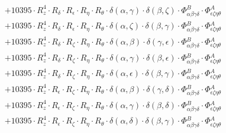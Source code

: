 \documentclass{article}
\begin{document}
\begin{equation}
\begin{array}{c}
 \\[0.2em] 		 + 10395 \cdot R_{z}^{4} \cdot R_{\delta{}} \cdot R_{\epsilon{}} \cdot R_{\eta{}} \cdot R_{\theta{}} \cdot \delta{}\left(\alpha{}, \gamma{}\right) \cdot \delta{}\left(\beta{}, \zeta{}\right) \cdot \Phi{}^{B}_{\alpha{}\beta{}\gamma{}\delta{}} \cdot \Phi{}^{A}_{\epsilon{}\zeta{}\eta{}\theta{}} 
 \\[0.2em] 		 + 10395 \cdot R_{z}^{4} \cdot R_{\delta{}} \cdot R_{\epsilon{}} \cdot R_{\eta{}} \cdot R_{\theta{}} \cdot \delta{}\left(\alpha{}, \zeta{}\right) \cdot \delta{}\left(\beta{}, \gamma{}\right) \cdot \Phi{}^{B}_{\alpha{}\beta{}\gamma{}\delta{}} \cdot \Phi{}^{A}_{\epsilon{}\zeta{}\eta{}\theta{}} 
 \\[0.2em] 		 + 10395 \cdot R_{z}^{4} \cdot R_{\delta{}} \cdot R_{\zeta{}} \cdot R_{\eta{}} \cdot R_{\theta{}} \cdot \delta{}\left(\alpha{}, \beta{}\right) \cdot \delta{}\left(\gamma{}, \epsilon{}\right) \cdot \Phi{}^{B}_{\alpha{}\beta{}\gamma{}\delta{}} \cdot \Phi{}^{A}_{\epsilon{}\zeta{}\eta{}\theta{}} 
 \\[0.2em] 		 + 10395 \cdot R_{z}^{4} \cdot R_{\delta{}} \cdot R_{\zeta{}} \cdot R_{\eta{}} \cdot R_{\theta{}} \cdot \delta{}\left(\alpha{}, \gamma{}\right) \cdot \delta{}\left(\beta{}, \epsilon{}\right) \cdot \Phi{}^{B}_{\alpha{}\beta{}\gamma{}\delta{}} \cdot \Phi{}^{A}_{\epsilon{}\zeta{}\eta{}\theta{}} 
 \\[0.2em] 		 + 10395 \cdot R_{z}^{4} \cdot R_{\delta{}} \cdot R_{\zeta{}} \cdot R_{\eta{}} \cdot R_{\theta{}} \cdot \delta{}\left(\alpha{}, \epsilon{}\right) \cdot \delta{}\left(\beta{}, \gamma{}\right) \cdot \Phi{}^{B}_{\alpha{}\beta{}\gamma{}\delta{}} \cdot \Phi{}^{A}_{\epsilon{}\zeta{}\eta{}\theta{}} 
 \\[0.2em] 		 + 10395 \cdot R_{z}^{4} \cdot R_{\epsilon{}} \cdot R_{\zeta{}} \cdot R_{\eta{}} \cdot R_{\theta{}} \cdot \delta{}\left(\alpha{}, \beta{}\right) \cdot \delta{}\left(\gamma{}, \delta{}\right) \cdot \Phi{}^{B}_{\alpha{}\beta{}\gamma{}\delta{}} \cdot \Phi{}^{A}_{\epsilon{}\zeta{}\eta{}\theta{}} 
 \\[0.2em] 		 + 10395 \cdot R_{z}^{4} \cdot R_{\epsilon{}} \cdot R_{\zeta{}} \cdot R_{\eta{}} \cdot R_{\theta{}} \cdot \delta{}\left(\alpha{}, \gamma{}\right) \cdot \delta{}\left(\beta{}, \delta{}\right) \cdot \Phi{}^{B}_{\alpha{}\beta{}\gamma{}\delta{}} \cdot \Phi{}^{A}_{\epsilon{}\zeta{}\eta{}\theta{}} 
 \\[0.2em] 		 + 10395 \cdot R_{z}^{4} \cdot R_{\epsilon{}} \cdot R_{\zeta{}} \cdot R_{\eta{}} \cdot R_{\theta{}} \cdot \delta{}\left(\alpha{}, \delta{}\right) \cdot \delta{}\left(\beta{}, \gamma{}\right) \cdot \Phi{}^{B}_{\alpha{}\beta{}\gamma{}\delta{}} \cdot \Phi{}^{A}_{\epsilon{}\zeta{}\eta{}\theta{}} 

\end{array}
\end{equation}
\end{document}
